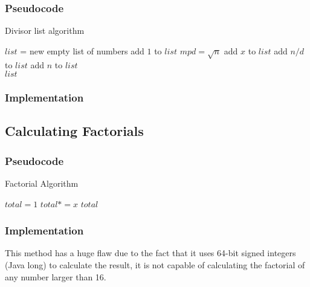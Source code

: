 \documentclass[letterpaper]{article}
\begin{document}
      \subsubsection{Pseudocode}
        \begin{algorithm}
          \caption{Divisor list algorithm}
          \begin{algorithmic}[1]
              \State $list$ = new empty list of numbers
              \State add $1$ to $list$
              \State $mpd = \sqrt{n}$
                  \State add $x$ to $list$
                    \State add $n/d$ to $list$
                  \EndIf
                \EndIf
              \EndFor
              \State add $n$ to $list$ \\
              \Return $list$
            \EndProcedure
          \end{algorithmic}
        \end{algorithm}

    \subsubsection{Implementation}
      

    \subsection{Calculating Factorials}

      \subsubsection{Pseudocode}
        \begin{algorithm}
          \caption{Factorial Algorithm}
          \begin{algorithmic}[1]
              \State $total=1$
                \State $total*=x$
              \EndFor
              \Return $total$
            \EndProcedure
          \end{algorithmic}
        \end{algorithm}

      \subsubsection{Implementation}
        This method has a huge flaw due to the fact that it uses 64-bit signed integers (Java long) to calculate the result, it is not capable of calculating the factorial of any number larger than 16.
        
\end{document}
